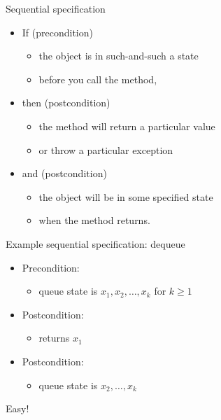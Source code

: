 \documentclass{beamer}
\begin{document}
\begin{frame}{Sequential specification}{}
  \begin{itemize}
    \item If \alert{(precondition)}
      \begin{itemize}
        \item the object is in such-and-such a state
        \item before you call the method,
      \end{itemize}
    \item<2-> then \alert{(postcondition)}
      \begin{itemize}
        \item the method will return a particular value
        \item or throw a particular exception
      \end{itemize}
    \item<3-> and \alert{(postcondition)}
      \begin{itemize}
        \item the object will be in some specified state
        \item when the method returns.
      \end{itemize}
  \end{itemize}
\end{frame}

\begin{frame}{Example sequential specification: dequeue}
  \begin{itemize}
    \item Precondition:
      \begin{itemize}
        \item queue state is $x_1, x_2, \ldots, x_k$ for $k \ge 1$
      \end{itemize}
    \item Postcondition:
      \begin{itemize}
        \item returns $x_1$
      \end{itemize}
    \item Postcondition:
      \begin{itemize}
        \item queue state is $x_2, \ldots, x_k$
      \end{itemize}
  \end{itemize}
  \pause
  Easy!
\end{frame}
\end{document}
